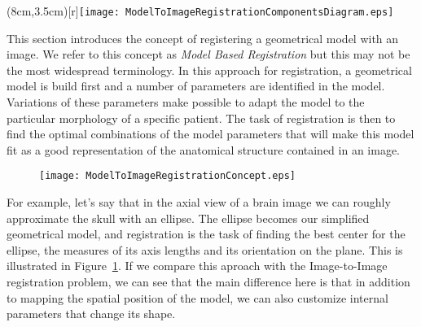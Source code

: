 %
%
%
%
%
%

\parpic(8cm,3.5cm)[r]{\texttt{[image: ModelToImageRegistrationComponentsDiagram.eps]}}

This section introduces the concept of registering a geometrical model with an
image. We refer to this concept as \emph{Model Based Registration} but this may
not be the most widespread terminology. In this approach for registration, a
geometrical model is build first and a number of parameters are identified in
the model. Variations of these parameters make possible to adapt the model to
the particular morphology of a specific patient. The task of registration is
then to find the optimal combinations of the model parameters that will make
this model fit as a good representation of the anatomical structure contained
in an image. 


\begin{figure}
\center
\texttt{[image: ModelToImageRegistrationConcept.eps]}
\label{fig:ModelToImageRegistrationConcept}
\end{figure}


For example, let's say that in the axial view of a brain image we can roughly
approximate the skull with an ellipse. The ellipse becomes our simplified
geometrical model, and registration is the task of finding the best center for
the ellipse, the measures of its axis lengths and its orientation on the plane.
This is illustrated in Figure~\ref{fig:ModelToImageRegistrationConcept}.  If we
compare this aproach with the Image-to-Image registration problem, we can see
that the main difference here is that in addition to mapping the spatial
position of the model, we can also customize internal parameters that change
its shape.

